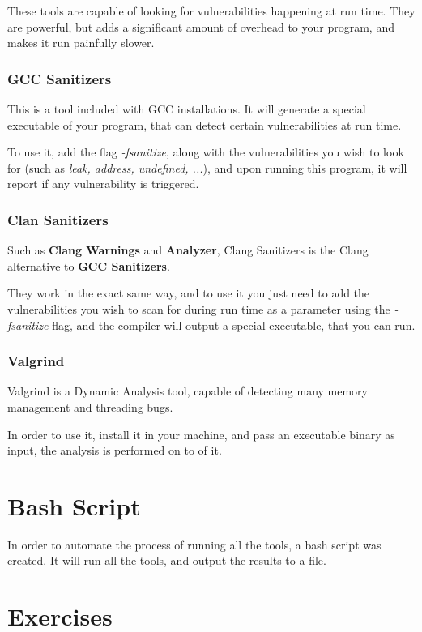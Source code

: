 \documentclass{article}
\begin{document}
These tools are capable of looking for vulnerabilities happening at run time. They are powerful, but adds a significant amount of overhead to your program, and makes it run painfully slower.

\subsubsection{GCC Sanitizers}

This is a tool included with GCC installations. It will generate a special executable of your program, that can detect certain vulnerabilities at run time.

To use it, add the flag \textit{-fsanitize}, along with the vulnerabilities you wish to look for (such as \textit{leak, address, undefined, ...}), and upon running this program, it will report if any vulnerability is triggered.

\subsubsection{Clan Sanitizers}

Such as \textbf{Clang Warnings} and \textbf{Analyzer}, Clang Sanitizers is the Clang alternative to \textbf{GCC Sanitizers}.

They work in the exact same way, and to use it you just need to add the vulnerabilities you wish to scan for during run time as a parameter using the \textit{-fsanitize} flag, and the compiler will output a special executable, that you can run.

\subsubsection{Valgrind}

Valgrind is a Dynamic Analysis tool, capable of detecting many memory management and threading bugs.

In order to use it, install it in your machine, and pass an executable binary as input, the analysis is performed on to of it.

\section{Bash Script}

In order to automate the process of running all the tools, a bash script was created. It will run all the tools, and output the results to a file.

\section{Exercises}
\end{document}

